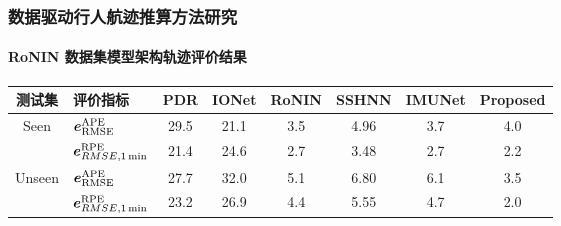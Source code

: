 \begin{frame}

	\frametitle{数据驱动行人航迹推算方法研究}	
	\framesubtitle{RoNIN 数据集模型架构轨迹评价结果}
    {
		\begin{tabular*}{\linewidth}{@{\extracolsep{\fill}} cl cccccc}
			\toprule
			测试集                   & 评价指标                                        & PDR  & IONet & RoNIN & SSHNN & IMUNet & Proposed \\
			\midrule
			\multirow{2}{*}{Seen}   & $\vb*{e}^{\mathrm{APE}}_{\mathrm{RMSE}}$        & 29.5 & 21.1  & 3.5   & 4.96  & 3.7    & 4.0 \\
			                        & $\vb*{e}^{\mathrm{RPE}}_{RMSE,\SI{1}{\minute}}$ & 21.4 & 24.6  & 2.7   & 3.48  & 2.7    & 2.2 \\
			\multirow{2}{*}{Unseen} & $\vb*{e}^{\mathrm{APE}}_{\mathrm{RMSE}}$        & 27.7 & 32.0  & 5.1   & 6.80  & 6.1    & 3.5 \\
						            & $\vb*{e}^{\mathrm{RPE}}_{RMSE,\SI{1}{\minute}}$ & 23.2 & 26.9  & 4.4   & 5.55  & 4.7    & 2.0 \\
			\bottomrule 
		\end{tabular*}     
   	}
 
\end{frame}

